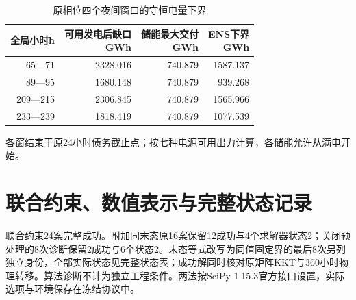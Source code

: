 \begin{table}[H]\centering\caption{原相位四个夜间窗口的守恒电量下界}
\begin{tabular}{rrrr}\toprule
全局小时h & \shortstack{可用发电后缺口\\GWh} & \shortstack{储能最大交付\\GWh} & \shortstack{ENS下界\\GWh}\\\midrule
65—71 & 2328.016 & 740.879 & 1587.137 \\
89—95 & 1680.148 & 740.879 & 939.268 \\
209—215 & 2306.845 & 740.879 & 1565.966 \\
233—239 & 1818.419 & 740.879 & 1077.539 \\
\bottomrule\end{tabular}
\smallskip\par\noindent 各窗结束于原24小时债务截止点；按七种电源可用出力计算，各储能允许从满电开始。
\end{table}\section{联合约束、数值表示与完整状态记录}
联合约束24案完整成功。附加同末态原16案保留12成功与4个求解器状态2；关闭预处理的8次诊断保留2成功与6个状态2。末态等式改写为同值固定界的最后8次另列独立身份，全部实际状态见完整状态表；成功解同时核对原矩阵KKT与360小时物理转移。算法诊断不计为独立工程条件。两法按SciPy 1.15.3官方接口设置，实际选项与环境保存在冻结协议中\cite{scipy_highs_1153}。

